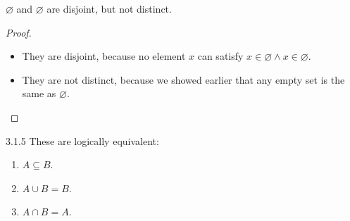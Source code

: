 \begin{why}{34}
	$\varnothing$ and $\varnothing$ are disjoint, but not distinct.
\end{why}
\begin{proof}\leavevmode
	\begin{itemize}
		\item They are disjoint, because no element $x$ can satisfy $x \in \varnothing \wedge x \in \varnothing$.
		\item They are not distinct, because we showed earlier that any empty set is the same as $\varnothing$.
	\end{itemize}
\end{proof}

\begin{exercise}{3.1.5}
These are logically equivalent:
\begin{enumerate}
	\item $A \subseteq B$.
	\item $A \cup B = B$.
	\item $A \cap B = A$.
\end{enumerate}
\end{exercise}
